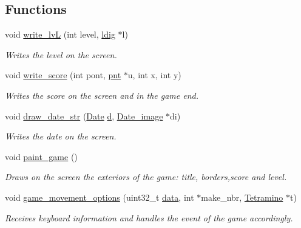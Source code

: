 \subsection*{Functions}
\begin{DoxyCompactItemize}
\item 
void \mbox{\hyperlink{group__game_gaf426df873300d051272115729c8fa5a1}{write\+\_\+lvL}} (int level, \mbox{\hyperlink{structldig}{ldig}} $\ast$l)
\begin{DoxyCompactList}\small\item\em Writes the level on the screen. \end{DoxyCompactList}\item 
void \mbox{\hyperlink{group__game_ga4447b1a565fed3c6130bf9e38970b933}{write\+\_\+score}} (int pont, \mbox{\hyperlink{structpnt}{pnt}} $\ast$u, int x, int y)
\begin{DoxyCompactList}\small\item\em Writes the score on the screen and in the game end. \end{DoxyCompactList}\item 
void \mbox{\hyperlink{group__game_ga75e50926d07db9cfd2bad44c163f2bdd}{draw\+\_\+date\+\_\+str}} (\mbox{\hyperlink{struct_date}{Date}} \mbox{\hyperlink{game_8c_a85641069b0d4478ab8a7356c3bf32ea3}{d}}, \mbox{\hyperlink{struct_date__image}{Date\+\_\+image}} $\ast$di)
\begin{DoxyCompactList}\small\item\em Writes the date on the screen. \end{DoxyCompactList}\item 
void \mbox{\hyperlink{group__game_ga11d44633d3eb30282274511c8a8d7511}{paint\+\_\+game}} ()
\begin{DoxyCompactList}\small\item\em Draws on the screen the exteriors of the game\+: title, borders,score and level. \end{DoxyCompactList}\item 
void \mbox{\hyperlink{group__game_ga553ba6d099151083884ae0d6c1e76771}{game\+\_\+movement\+\_\+options}} (uint32\+\_\+t \mbox{\hyperlink{mouse_8c_a325819a8e492ac69542e8b31705af6e9}{data}}, int $\ast$make\+\_\+nbr, \mbox{\hyperlink{struct_tetramino}{Tetramino}} $\ast$t)
\begin{DoxyCompactList}\small\item\em Receives keyboard information and handles the event of the game accordingly. \end{DoxyCompactList}\item 

\end{DoxyCompactItemize}
